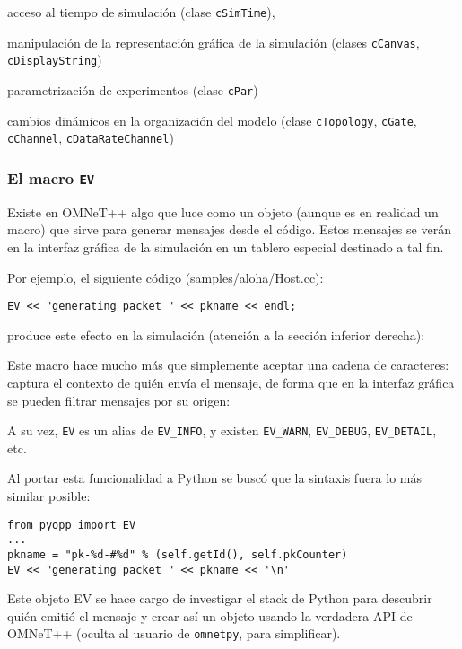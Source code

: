 \documentclass[]{article}
\begin{document}
acceso al tiempo de simulación (clase \verb!cSimTime!),

manipulación de la representación gráfica de la simulación (clases
\verb!cCanvas!, \verb!cDisplayString!)

parametrización de experimentos (clase \verb!cPar!)

cambios dinámicos en la organización del modelo (clase \verb!cTopology!,
\verb!cGate!, \verb!cChannel!, \verb!cDataRateChannel!)

\subsubsection{El macro \texttt{EV}}

Existe en OMNeT++ algo que luce como un objeto (aunque es en realidad un macro)
que sirve para generar mensajes desde el código. Estos mensajes se verán en la
interfaz gráfica de la simulación en un tablero especial destinado a tal fin.

Por ejemplo, el siguiente código (samples/aloha/Host.cc):

\begin{verbatim}
EV << "generating packet " << pkname << endl;
\end{verbatim}

produce este efecto en la simulación (atención a la sección inferior derecha):


Este macro hace mucho más que simplemente aceptar una cadena de caracteres:
captura el contexto de quién envía el mensaje, de forma que en la interfaz
gráfica se pueden filtrar mensajes por su origen:


A su vez, \verb!EV! es un alias de \verb!EV_INFO!, y existen \verb!EV_WARN!,
\verb!EV_DEBUG!, \verb!EV_DETAIL!, etc.

Al portar esta funcionalidad a Python se buscó que la sintaxis fuera lo más
similar posible:

\begin{verbatim}
from pyopp import EV
...
pkname = "pk-%d-#%d" % (self.getId(), self.pkCounter)
EV << "generating packet " << pkname << '\n'
\end{verbatim}

Este objeto EV se hace cargo de investigar el stack de Python para descubrir
quién emitió el mensaje y crear así un objeto usando la verdadera API de
OMNeT++ (oculta al usuario de \verb!omnetpy!, para simplificar).
\end{document}
